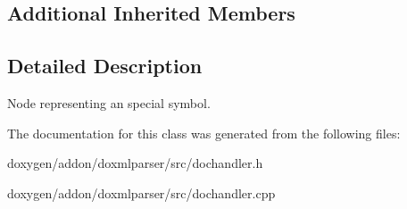 \subsection*{Additional Inherited Members}


\subsection{Detailed Description}
Node representing an special symbol. 



The documentation for this class was generated from the following files\+:\begin{DoxyCompactItemize}
\item 
doxygen/addon/doxmlparser/src/dochandler.\+h\item 
doxygen/addon/doxmlparser/src/dochandler.\+cpp\end{DoxyCompactItemize}
